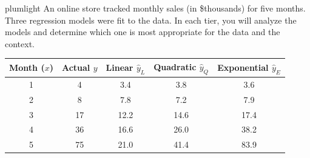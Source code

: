 \documentclass[10pt]{article}
\begin{document}
\namepartnerperiod

\vspace{0.1in}

\begin{scenariobox}{plumlight}
\small
An online store tracked monthly sales (in \$thousands) for five months. Three regression
models were fit to the data. In each tier, you will analyze the models and determine which
one is most appropriate for the data and the context.

\medskip
\begin{center}
\renewcommand{\arraystretch}{1.4}
\begin{tabular}{c|c|c|c|c}
\textbf{Month ($x$)} & \textbf{Actual $y$} & \textbf{Linear $\hat{y}_L$} & \textbf{Quadratic $\hat{y}_Q$} & \textbf{Exponential $\hat{y}_E$} \\
\hline
1 &  4 & 3.4  & 3.8  & 3.6 \\
2 &  8 & 7.8  & 7.2  & 7.9 \\
3 & 17 & 12.2 & 14.6 & 17.4 \\
4 & 36 & 16.6 & 26.0 & 38.2 \\
5 & 75 & 21.0 & 41.4 & 83.9 \\
\end{tabular}
\end{center}
\end{scenariobox}

\vspace{0.1in}
\end{document}
